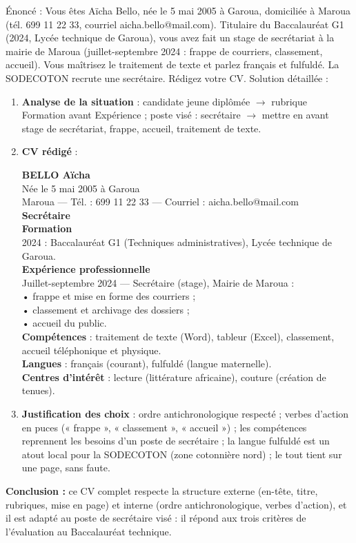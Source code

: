 \documentclass[11pt]{article}
\begin{document}
\begin{exoresolu}
Énoncé : Vous êtes Aïcha Bello, née le 5 mai 2005 à Garoua, domiciliée à Maroua (tél. 699 11 22 33, courriel aicha.bello@mail.com). Titulaire du Baccalauréat G1 (2024, Lycée technique de Garoua), vous avez fait un stage de secrétariat à la mairie de Maroua (juillet-septembre 2024 : frappe de courriers, classement, accueil). Vous maîtrisez le traitement de texte et parlez français et fulfuldé. La SODECOTON recrute une secrétaire. Rédigez votre CV.
\tcblower
Solution détaillée :
\begin{enumerate}
\item \textbf{Analyse de la situation} : candidate jeune diplômée $\rightarrow$ rubrique Formation avant Expérience ; poste visé : secrétaire $\rightarrow$ mettre en avant stage de secrétariat, frappe, accueil, traitement de texte.
\item \textbf{CV rédigé} :
\begin{center}
\textbf{BELLO Aïcha}\\
Née le 5 mai 2005 à Garoua\\
Maroua — Tél. : 699 11 22 33 — Courriel : aicha.bello@mail.com\\[4pt]
\textbf{Secrétaire}\\[4pt]
\textbf{Formation}\\
2024 : Baccalauréat G1 (Techniques administratives), Lycée technique de Garoua.\\[4pt]
\textbf{Expérience professionnelle}\\
Juillet-septembre 2024 — Secrétaire (stage), Mairie de Maroua :\\
• frappe et mise en forme des courriers ;\\
• classement et archivage des dossiers ;\\
• accueil du public.\\[4pt]
\textbf{Compétences} : traitement de texte (Word), tableur (Excel), classement, accueil téléphonique et physique.\\
\textbf{Langues} : français (courant), fulfuldé (langue maternelle).\\
\textbf{Centres d'intérêt} : lecture (littérature africaine), couture (création de tenues).
\end{center}
\item \textbf{Justification des choix} : ordre antichronologique respecté ; verbes d'action en puces (« frappe », « classement », « accueil ») ; les compétences reprennent les besoins d'un poste de secrétaire ; la langue fulfuldé est un atout local pour la SODECOTON (zone cotonnière nord) ; le tout tient sur une page, sans faute.
\end{enumerate}
\textbf{Conclusion :} ce CV complet respecte la structure externe (en-tête, titre, rubriques, mise en page) et interne (ordre antichronologique, verbes d'action), et il est adapté au poste de secrétaire visé : il répond aux trois critères de l'évaluation au Baccalauréat technique.
\end{exoresolu}
\end{document}
